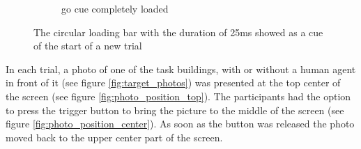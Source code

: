 \begin{figure}[!htb]
\begin{subfigure}[b]{0.3\linewidth}
		\caption{go cue completely loaded}
		\label{fig:go_cue_full}
	\end{subfigure}
	
	\caption[Start of trial cue]{The circular loading bar with the duration of 25ms showed as a cue of the start of a new trial
	}
	\label{fig:go_cue}
\end{figure}

In each trial, a photo of one of the task buildings, with or without a human agent in front of it (see figure \ref{fig:target_photos}) was presented at the top center of the screen (see figure \ref{fig:photo_position_top}). The participants had the option to press the trigger button to bring the picture to the middle of the screen (see figure \ref{fig:photo_position_center}). As soon as the button was released the photo moved back to the upper center part of the screen.


